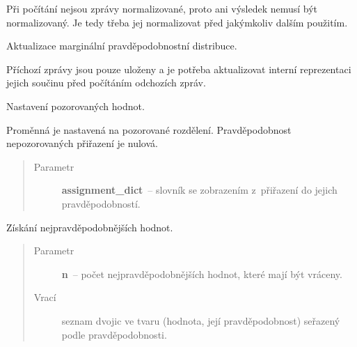 \begin{fulllineitems}
\begin{fulllineitems}
Při počítání nejsou zprávy normalizované, proto ani výsledek nemusí být
normalizovaný.
Je tedy třeba jej normalizovat před jakýmkoliv dalším použitím.

\end{fulllineitems}


\begin{fulllineitems}
\label{alex.infer:alex.infer.factor.alex.infer.node.DiscreteVariableNode.update}
Aktualizace marginální pravděpodobnostní distribuce.

Příchozí zprávy jsou pouze uloženy a je potřeba aktualizovat interní
reprezentaci jejich součinu před počítáním odchozích zpráv.

\end{fulllineitems}


\begin{fulllineitems}
\label{alex.infer:alex.infer.factor.alex.infer.node.DiscreteVariableNode.observed}
Nastavení pozorovaných hodnot.

Proměnná je nastavená na pozorované rozdělení. Pravděpodobnost nepozorovaných přiřazení
je nulová.
\begin{quote}\begin{description}
\item[{Parametr}] \leavevmode
\textbf{assignment\_dict}~-- slovník se zobrazením z~přiřazení do jejich pravděpodobností.

\end{description}\end{quote}

\end{fulllineitems}


\begin{fulllineitems}
\label{alex.infer:alex.infer.factor.alex.infer.node.DiscreteVariableNode.most_probable}
Získání nejpravděpodobnějších hodnot.
\begin{quote}\begin{description}
\item[{Parametr}] \leavevmode
\textbf{n}~-- počet nejpravděpodobnějších hodnot, které mají být vráceny.

\item[{Vrací}] \leavevmode
seznam dvojic ve tvaru (hodnota, její pravděpodobnost) seřazený podle pravděpodobnosti.

\end{description}\end{quote}

\end{fulllineitems}


\end{fulllineitems}


